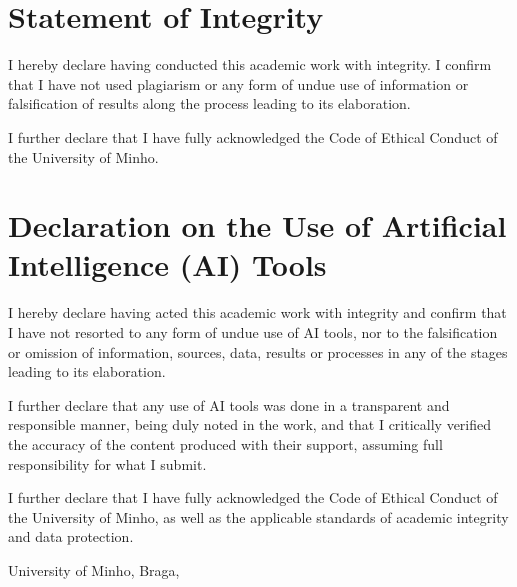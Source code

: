 \pagebreak

\section*{Statement of Integrity}
\setlength{\parskip}{1em}
\noindent
I hereby declare having conducted this academic work with integrity. I confirm that I have not used plagiarism or any form of undue use of information or falsification of results along the process leading to its elaboration.

\noindent
I further declare that I have fully acknowledged the Code of Ethical Conduct of the University of Minho.

\section*{Declaration on the Use of Artificial Intelligence (AI) Tools}
\setlength{\parskip}{1em}
\noindent
I hereby declare having acted this academic work with integrity and confirm that I have not resorted to any form of undue use of AI
tools, nor to the falsification or omission of information, sources, data, results or processes in any of the stages leading to its
elaboration.

\noindent
I further declare that any use of AI tools was done in a transparent and responsible manner, being duly noted in the work, and that I
critically verified the accuracy of the content produced with their support, assuming full responsibility for what I submit.

\noindent
I further declare that I have fully acknowledged the Code of Ethical Conduct of the University of Minho, as well as the applicable
standards of academic integrity and data protection.

\phantom{space}

\noindent
University of Minho, Braga, \myear

\vspace{25mm}
\noindent\theauthor
\setlength{\parskip}{0em}